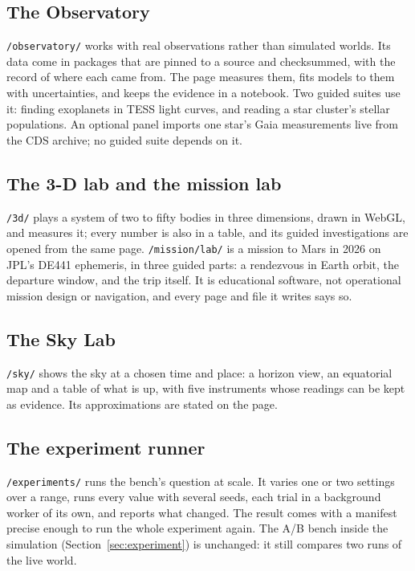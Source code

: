 \documentclass[11pt,a4paper]{article}
\begin{document}
\subsection{The Observatory}

\texttt{/observatory/} works with real observations rather than simulated
worlds. Its data come in packages that are pinned to a source and checksummed,
with the record of where each came from. The page measures them, fits models
to them with uncertainties, and keeps the evidence in a notebook. Two guided
suites use it: finding exoplanets in TESS light curves, and reading a star
cluster's stellar populations. An optional panel imports one star's Gaia
measurements live from the CDS archive; no guided suite depends on it.

\subsection{The 3-D lab and the mission lab}

\texttt{/3d/} plays a system of two to fifty bodies in three dimensions, drawn
in WebGL, and measures it; every number is also in a table, and its guided
investigations are opened from the same page. \texttt{/mission/lab/} is a
mission to Mars in 2026 on JPL's DE441 ephemeris, in three guided parts: a
rendezvous in Earth orbit, the departure window, and the trip itself. It is
educational software, not operational mission design or navigation, and every
page and file it writes says so.

\subsection{The Sky Lab}

\texttt{/sky/} shows the sky at a chosen time and place: a horizon view, an
equatorial map and a table of what is up, with five instruments whose readings
can be kept as evidence. Its approximations are stated on the page.

\subsection{The experiment runner}

\texttt{/experiments/} runs the bench's question at scale. It varies one or two
settings over a range, runs every value with several seeds, each trial in a
background worker of its own, and reports what changed. The result comes with a
manifest precise enough to run the whole experiment again. The A/B bench inside
the simulation (Section~\ref{sec:experiment}) is unchanged: it still compares
two runs of the live world.
\end{document}
